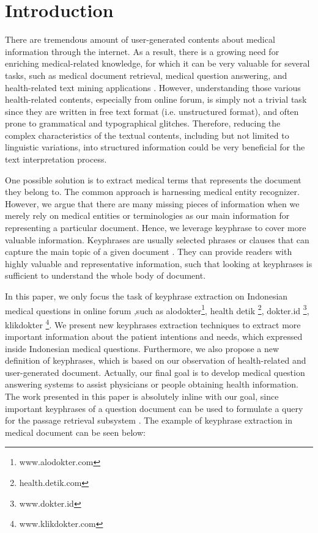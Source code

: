\section{Introduction}

There are tremendous amount of user-generated contents about medical information through the internet. As a result, there is a growing need for enriching medical-related knowledge, for which it can be very valuable for several tasks, such as medical document retrieval, medical question answering, and health-related text mining applications \cite{cao2010automatically}. However, understanding those various health-related contents, especially from online forum, is simply not a trivial task since they are written in free text format (i.e. unstructured format), and often prone to grammatical and typographical glitches. Therefore, reducing the complex characteristics of the textual contents, including but not limited to linguistic variations, into structured information could be very beneficial for the text interpretation process. 

One possible solution is to extract medical terms that represents the document they belong to. The common approach is harnessing medical entity recognizer. However, we argue that there are many missing pieces of information when we merely rely on medical entities or terminologies as our main information for representing a particular document. Hence, we leverage keyphrase to cover more valuable information. Keyphrases are usually selected phrases or clauses that can capture the main topic of a given document \cite{turney2000learning}. They can provide readers with highly valuable and representative information, such that looking at keyphrases is sufficient to understand the whole body of document.

In this paper, we only focus the task of keyphrase extraction on Indonesian medical questions in online forum ,such as alodokter\footnote{www.alodokter.com}, health detik \footnote{health.detik.com}, dokter.id \footnote{www.dokter.id}, klikdokter \footnote{www.klikdokter.com}. We present new keyphrases extraction techniques to extract more important information about the patient intentions and needs, which expressed inside Indonesian medical questions. Furthermore, we also propose a new definition of keyphrases, which is based on our observation of health-related and user-generated document. Actually, our final goal is to develop medical question answering systems to assist physicians or people obtaining health information. The work presented in this paper is absolutely inline with our goal, since important keyphrases of a question document can be used to formulate a query for the passage retrieval subsystem \cite{gong2009improving}. The example of keyphrase extraction in medical document can be seen below:

